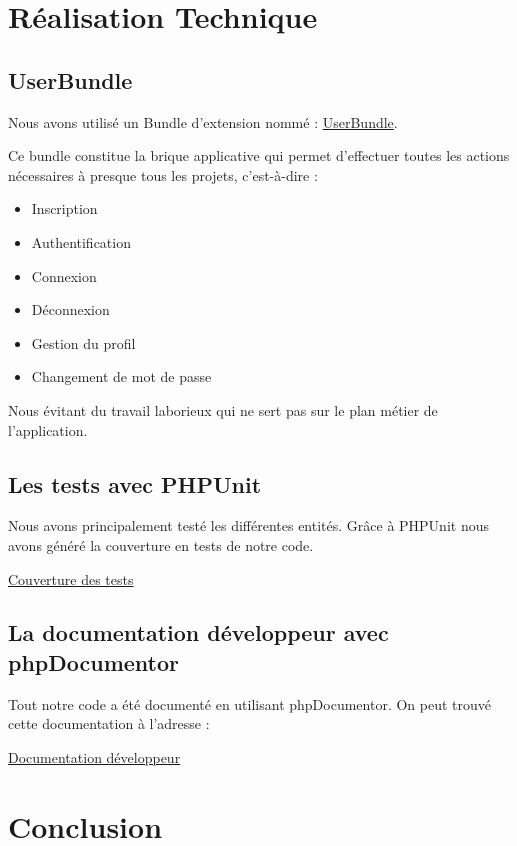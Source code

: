 \documentclass{report}
\begin{document}
  \section{Réalisation Technique}
    \subsection{UserBundle}
      Nous avons utilisé un Bundle d'extension nommé : 
      \href{https://github.com/FriendsOfSymfony/FOSUserBundle}{UserBundle}.
      
      Ce bundle constitue la brique applicative qui permet d'effectuer toutes les actions nécessaires à presque tous les projets, c'est-à-dire :
      \begin{itemize}
        \item{Inscription}
        \item{Authentification}
        \item{Connexion}
        \item{Déconnexion}
        \item{Gestion du profil}
        \item{Changement de mot de passe}
      \end{itemize}
      Nous évitant du travail laborieux qui ne sert pas sur le plan métier de l'application.

    \subsection{Les tests avec PHPUnit}
			Nous avons principalement testé les différentes entités. Grâce à PHPUnit nous avons généré la couverture en tests de notre code.

			\href{http://ares-ensiie.eu/~unbekandt2011/UnsapaIPW/cov}{Couverture des tests}
    \subsection{La documentation développeur avec phpDocumentor}
			Tout notre code a été documenté en utilisant phpDocumentor. On peut trouvé cette documentation à l'adresse :

			\href{http://ares-ensiie.eu/~unbekandt2011/UnsapaIPW/doc}{Documentation développeur}

  \section*{Conclusion}
\end{document}
